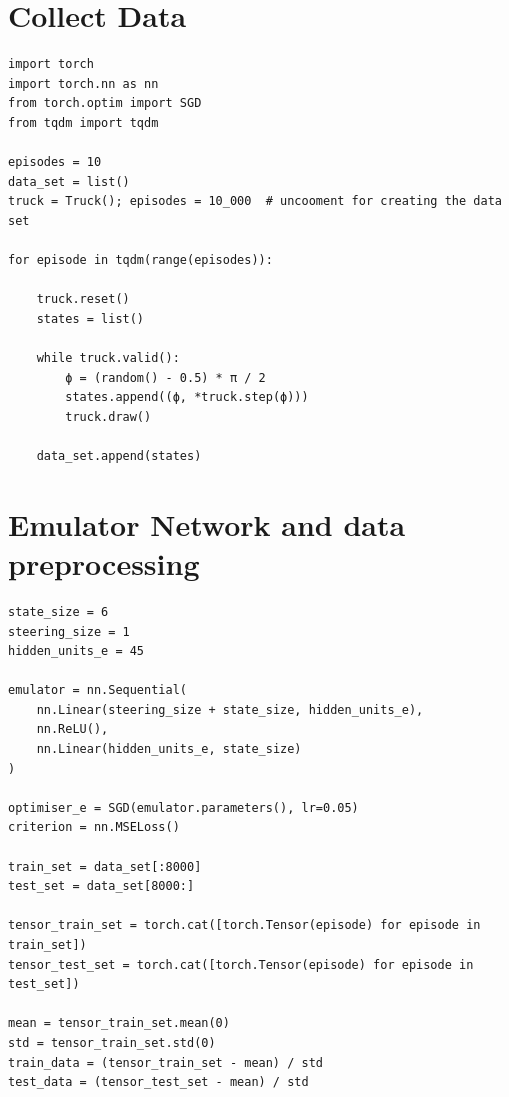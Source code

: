 \section{Collect Data}
\begin{verbatim}
import torch
import torch.nn as nn
from torch.optim import SGD
from tqdm import tqdm

episodes = 10
data_set = list()
truck = Truck(); episodes = 10_000  # uncooment for creating the data set

for episode in tqdm(range(episodes)):
    
    truck.reset()
    states = list()
    
    while truck.valid():
        ϕ = (random() - 0.5) * π / 2
        states.append((ϕ, *truck.step(ϕ)))
        truck.draw()
    
    data_set.append(states)
\end{verbatim}

\section{Emulator Network and data preprocessing}
\begin{verbatim}
state_size = 6
steering_size = 1
hidden_units_e = 45

emulator = nn.Sequential(
    nn.Linear(steering_size + state_size, hidden_units_e),
    nn.ReLU(),
    nn.Linear(hidden_units_e, state_size)
)

optimiser_e = SGD(emulator.parameters(), lr=0.05)
criterion = nn.MSELoss()

train_set = data_set[:8000]
test_set = data_set[8000:]

tensor_train_set = torch.cat([torch.Tensor(episode) for episode in train_set])
tensor_test_set = torch.cat([torch.Tensor(episode) for episode in test_set])

mean = tensor_train_set.mean(0)
std = tensor_train_set.std(0)
train_data = (tensor_train_set - mean) / std
test_data = (tensor_test_set - mean) / std


\end{verbatim}

